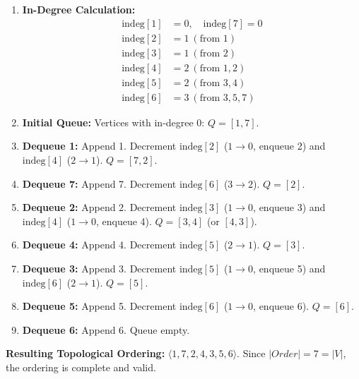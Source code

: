 \documentclass[10pt,journal,compsoc,onecolumn]{IEEEtran}
\begin{document}
\begin{enumerate}
    \item \textbf{In-Degree Calculation:}
    \begin{align*}
    \text{indeg}[1] &= 0, \quad \text{indeg}[7] = 0 \\
    \text{indeg}[2] &= 1 \ (\text{from } 1) \\
    \text{indeg}[3] &= 1 \ (\text{from } 2) \\
    \text{indeg}[4] &= 2 \ (\text{from } 1, 2) \\
    \text{indeg}[5] &= 2 \ (\text{from } 3, 4) \\
    \text{indeg}[6] &= 3 \ (\text{from } 3, 5, 7)
    \end{align*}
    \item \textbf{Initial Queue:} Vertices with in-degree 0: $Q = [1, 7]$.
    \item \textbf{Dequeue 1:} Append 1. Decrement $\text{indeg}[2]$ ($1 \to 0$, enqueue 2) and $\text{indeg}[4]$ ($2 \to 1$). $Q = [7, 2]$.
    \item \textbf{Dequeue 7:} Append 7. Decrement $\text{indeg}[6]$ ($3 \to 2$). $Q = [2]$.
    \item \textbf{Dequeue 2:} Append 2. Decrement $\text{indeg}[3]$ ($1 \to 0$, enqueue 3) and $\text{indeg}[4]$ ($1 \to 0$, enqueue 4). $Q = [3, 4]$ (or $[4, 3]$).
    \item \textbf{Dequeue 4:} Append 4. Decrement $\text{indeg}[5]$ ($2 \to 1$). $Q = [3]$.
    \item \textbf{Dequeue 3:} Append 3. Decrement $\text{indeg}[5]$ ($1 \to 0$, enqueue 5) and $\text{indeg}[6]$ ($2 \to 1$). $Q = [5]$.
    \item \textbf{Dequeue 5:} Append 5. Decrement $\text{indeg}[6]$ ($1 \to 0$, enqueue 6). $Q = [6]$.
    \item \textbf{Dequeue 6:} Append 6. Queue empty.
\end{enumerate}
\textbf{Resulting Topological Ordering:} $\langle 1, 7, 2, 4, 3, 5, 6 \rangle$. Since $|Order| = 7 = |V|$, the ordering is complete and valid.
\end{document}
